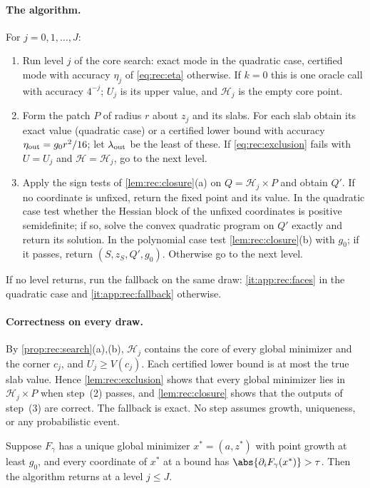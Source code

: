 \paragraph{The algorithm.}
For $j=0,1,\ldots,J$:
\begin{enumerate}[label=(\arabic*)]
\item Run level $j$ of the core search: exact mode in the quadratic case,
certified mode with accuracy $\eta_j$ of \eqref{eq:rec:eta} otherwise. If
$k=0$ this is one oracle call with accuracy $4^{-j}$; $U_j$ is its upper
value, and $\mathcal H_j$ is the empty core point.
\item Form the patch $P$ of radius $r$ about $z_j$ and its slabs. For each
slab obtain its exact value (quadratic case) or a certified lower bound with
accuracy $\eta_{\rm out}=g_0r^2/16$; let $\lambda_{\rm out}$ be the least of
these. If \eqref{eq:rec:exclusion} fails with $U=U_j$ and
$\mathcal H=\mathcal H_j$, go to the next level.
\item Apply the sign tests of \cref{lem:rec:closure}(a) on
$Q=\mathcal H_j\times P$ and obtain $Q'$. If no coordinate is unfixed,
return the fixed point and its value. In the quadratic case test whether
the Hessian block of the unfixed coordinates is positive semidefinite; if so,
solve the convex quadratic program on $Q'$ exactly
\citep{kozlov1980-the-polynomial-solvability-of-convex} and return its solution. In the
polynomial case test \cref{lem:rec:closure}(b) with $g_0$; if it passes,
return $(S,z_S,Q',g_0)$. Otherwise go to the next level.
\end{enumerate}
If no level returns, run the fallback on the same draw:
\ref{it:app:rec:faces} in the quadratic case and \ref{it:app:rec:fallback}
otherwise.

\paragraph{Correctness on every draw.}
By \cref{prop:rec:search}(a),(b), $\mathcal H_j$ contains the core of every
global minimizer and the corner $c_j$, and $U_j\ge V(c_j)$. Each certified
lower bound is at most the true slab value. Hence \cref{lem:rec:exclusion}
shows that every global minimizer lies in $\mathcal H_j\times P$ when step~(2)
passes, and \cref{lem:rec:closure} shows that the outputs of step~(3) are
correct. The fallback is exact. No step assumes growth, uniqueness, or any
probabilistic event.

\begin{lemma}[Stopping]\label{lem:app:rec:stopping}
Suppose $F_\gamma$ has a unique global minimizer $x^*=(a,z^*)$ with point
growth at least $g_0$, and every coordinate of $x^*$ at a bound has
$\abs{\partial_iF_\gamma(x^*)}>\tau$. Then the algorithm returns at a level
$j\le J$.
\end{lemma}


